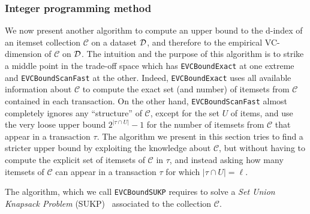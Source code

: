 
\subsubsection{Integer programming method}
We now present another algorithm to compute an upper bound to the d-index of an
itemset collection $\mathcal{C}$ on a dataset ${\cal D}$, and therefore to the
empirical VC-dimension of $\mathcal{C}$ on ${\cal D}$. The intuition and the purpose
of this algorithm is to strike a middle point in the trade-off space which has
\texttt{EVCBoundExact} at one extreme and \texttt{EVCBoundScanFast} at the
other. Indeed, \texttt{EVCBoundExact} uses all available information about
$\mathcal{C}$ to compute the exact set (and number) of itemsets from
$\mathcal{C}$ contained in each transaction. On the other hand,
\texttt{EVCBoundScanFast} almost completely ignores any ``structure'' of
$\mathcal{C}$, except for the set $U$ of items, and use the very loose upper bound
$2^{|\tau\cap U|}-1$ for the number of itemsets from $\mathcal{C}$ that appear
in a transaction $\tau$. The algorithm we present in this section tries to find
a stricter upper bound by exploiting the knowledge about $\mathcal{C}$, but
without having to compute the explicit set of itemsets of $\mathcal{C}$ in
$\tau$, and instead asking how many itemsets of $\mathcal{C}$ can appear in a
transaction $\tau$ for which $|\tau\cap U|=\ell$.

The algorithm, which we call \texttt{EVCBoundSUKP} requires to solve a \emph{Set
Union Knapsack Problem} (SUKP)~\citep{GoldschmidtNY94} associated to the
collection $\mathcal{C}$.

